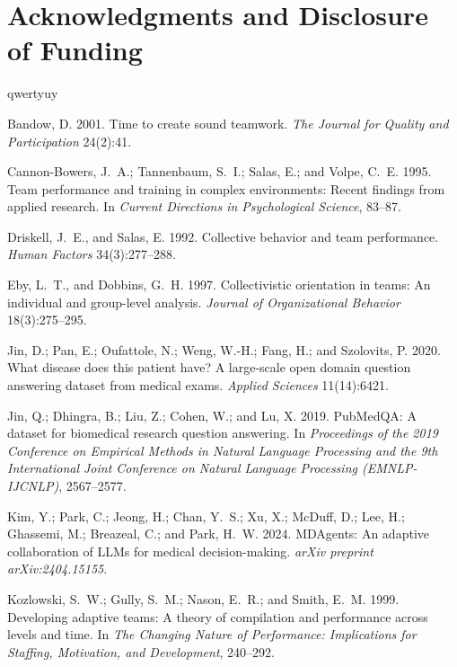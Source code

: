 \documentclass[letterpaper]{article} %
\begin{document}
\section{Acknowledgments and Disclosure of Funding}
qwertyuy



\begin{thebibliography}{99}

Bandow, D. 2001.
Time to create sound teamwork.
\textit{The Journal for Quality and Participation} 24(2):41.

Cannon-Bowers, J.~A.; Tannenbaum, S.~I.; Salas, E.; and Volpe, C.~E. 1995.
Team performance and training in complex environments: Recent findings from applied research.
In \textit{Current Directions in Psychological Science}, 83--87.

Driskell, J.~E., and Salas, E. 1992.
Collective behavior and team performance.
\textit{Human Factors} 34(3):277--288.

Eby, L.~T., and Dobbins, G.~H. 1997.
Collectivistic orientation in teams: An individual and group-level analysis.
\textit{Journal of Organizational Behavior} 18(3):275--295.

Jin, D.; Pan, E.; Oufattole, N.; Weng, W.-H.; Fang, H.; and Szolovits, P. 2020.
What disease does this patient have? A large-scale open domain question answering dataset from medical exams.
\textit{Applied Sciences} 11(14):6421.

Jin, Q.; Dhingra, B.; Liu, Z.; Cohen, W.; and Lu, X. 2019.
PubMedQA: A dataset for biomedical research question answering.
In \textit{Proceedings of the 2019 Conference on Empirical Methods in Natural Language Processing and the 9th International Joint Conference on Natural Language Processing (EMNLP-IJCNLP)}, 2567--2577.

Kim, Y.; Park, C.; Jeong, H.; Chan, Y.~S.; Xu, X.; McDuff, D.; Lee, H.; Ghassemi, M.; Breazeal, C.; and Park, H.~W. 2024.
MDAgents: An adaptive collaboration of LLMs for medical decision-making.
\textit{arXiv preprint arXiv:2404.15155}.

Kozlowski, S.~W.; Gully, S.~M.; Nason, E.~R.; and Smith, E.~M. 1999.
Developing adaptive teams: A theory of compilation and performance across levels and time.
In \textit{The Changing Nature of Performance: Implications for Staffing, Motivation, and Development}, 240--292.


\end{thebibliography}
\end{document}
